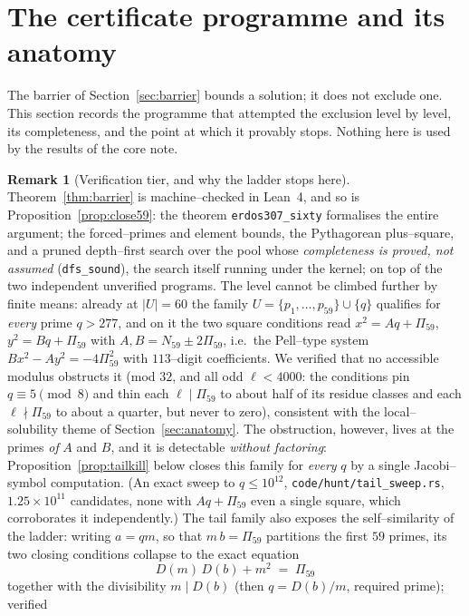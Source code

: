 \documentclass[11pt]{article}
\theoremstyle{definition}
\newtheorem{remark}[theorem]{Remark}
\begin{document}
\section{The certificate programme and its anatomy}\label{sec:certificate}

The barrier of Section~\ref{sec:barrier} bounds a solution; it does not exclude one. This section
records the programme that attempted the exclusion level by level, its completeness, and the point
at which it provably stops. Nothing here is used by the results of the core note.

\begin{remark}[Verification tier, and why the ladder stops here]\label{rem:tier60}
Theorem~\ref{thm:barrier} is machine--checked in Lean~4, and so is
Proposition~\ref{prop:close59}: the theorem \texttt{erdos307\_sixty} formalises the entire
argument; the forced--primes and element bounds, the Pythagorean plus--square, and a pruned
depth--first search over the pool whose \emph{completeness is proved, not assumed}
(\texttt{dfs\_sound}), the search itself running under the kernel; on top of the
two independent unverified programs. The level cannot be climbed further by finite means: already at $|U|=60$ the family
$U=\{p_1,\dots,p_{59}\}\cup\{q\}$ qualifies for \emph{every} prime $q>277$, and on it the two square
conditions read $x^2=Aq+\Pi_{59}$, $y^2=Bq+\Pi_{59}$ with $A,B=N_{59}\pm2\Pi_{59}$, i.e.\ the
Pell--type system $Bx^2-Ay^2=-4\Pi_{59}^2$ with $113$--digit coefficients. We verified that no
accessible modulus obstructs it (mod $32$, and all odd $\ell<4000$: the conditions pin
$q\equiv5\pmod 8$ and thin each $\ell\mid\Pi_{59}$ to about half of its residue classes and each
$\ell\nmid\Pi_{59}$ to about a quarter, but never to zero), consistent with the local--solubility
theme of Section~\ref{sec:anatomy}. The obstruction, however, lives at the primes \emph{of} $A$
and $B$, and it is detectable \emph{without factoring}: Proposition~\ref{prop:tailkill} below
closes this family for \emph{every} $q$ by a single Jacobi--symbol computation. (An exact sweep to
$q\le10^{12}$, \texttt{code/hunt/tail\_sweep.rs}, $1.25\times10^{11}$ candidates, none with
$Aq+\Pi_{59}$ even a single square, which corroborates it independently.) The tail family also exposes the self--similarity of the ladder:
writing $a=qm$, so that $m\,b=\Pi_{59}$ partitions the first $59$ primes, its two closing
conditions collapse to the exact equation
\[ D(m)\,D(b)+m^2\;=\;\Pi_{59} \]
together with the divisibility $m\mid D(b)$ (then $q=D(b)/m$, required prime); verified

\end{remark}
\end{document}
